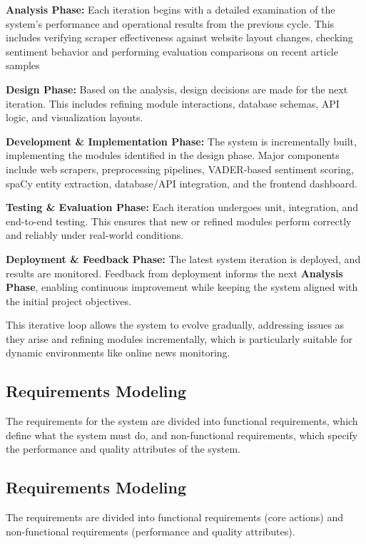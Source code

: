 \textbf{Analysis Phase:} Each iteration begins with a detailed examination of the system's performance and operational results from the previous cycle. This includes verifying scraper effectiveness against website layout changes, checking sentiment behavior and performing evaluation comparisons on recent article samples

\textbf{Design Phase:} Based on the analysis, design decisions are made for the next iteration. This includes refining module interactions, database schemas, API logic, and visualization layouts.

\textbf{Development \& Implementation Phase:} The system is incrementally built, implementing the modules identified in the design phase. Major components include web scrapers, preprocessing pipelines, VADER-based sentiment scoring, spaCy entity extraction, database/API integration, and the frontend dashboard.

\textbf{Testing \& Evaluation Phase:} Each iteration undergoes unit, integration, and end-to-end testing. This ensures that new or refined modules perform correctly and reliably under real-world conditions.

\textbf{Deployment \& Feedback Phase:} The latest system iteration is deployed, and results are monitored. Feedback from deployment informs the next \textbf{Analysis Phase}, enabling continuous improvement while keeping the system aligned with the initial project objectives.

This iterative loop allows the system to evolve gradually, addressing issues as they arise and refining modules incrementally, which is particularly suitable for dynamic environments like online news monitoring.

\subsection{Requirements Modeling}
\label{requirements-modeling}

The requirements for the system are divided into functional requirements, which define what the system must do, and non-functional requirements, which specify the performance and quality attributes of the system.

\subsection{Requirements Modeling}
\label{requirements-modeling-1}

The requirements are divided into functional requirements (core actions) and non-functional requirements (performance and quality attributes).

